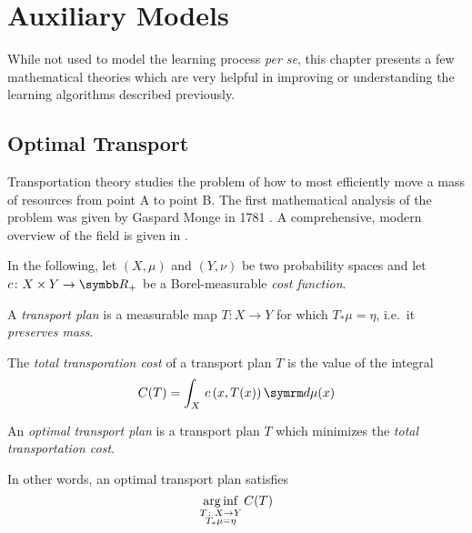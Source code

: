 \chapter{Auxiliary Models}

While not used to model the learning process \textit{per se}, this chapter presents a few mathematical theories which are very helpful in improving or understanding the learning algorithms described previously.



\section{Optimal Transport}

Transportation theory studies the problem of how to most efficiently move a mass of resources from point A to point B. The first mathematical analysis of the problem was given by Gaspard Monge in 1781 \cite{Monge1781}. A comprehensive, modern overview of the field is given in \cite{Villani2009}.

In the following, let \(\left(X, \mu\right)\) and \(\left(Y, \nu\right)\) be two probability spaces and let \(c \colon X \times Y \to \reals_{+}\) be a Borel-measurable \emph{cost function}.

\begin{definition}
A \emph{transport plan} is a measurable map \(T \colon X \to Y\) for which \(T_{*} \mu = \eta\), i.e.\ it \emph{preserves mass}.
\end{definition}

\begin{definition}
The \emph{total transporation cost} of a transport plan \(T\) is the value of the integral
\[
    C(T) = \int_{X} \, c\left(x, T(x)\right) \diff \mu(x)
\]
\end{definition}

\begin{definition}
An \emph{optimal transport plan} is a transport plan \(T\) which minimizes the \emph{total transportation cost}.
\end{definition}

In other words, an optimal transport plan satisfies
\[
    \operatorname*{arg\,inf}_{\substack{T \colon X \to Y \\ T_{*} \mu = \eta}} C(T)
\]


